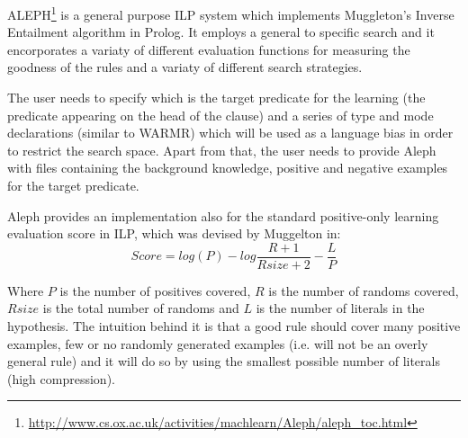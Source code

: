 ALEPH\footnote{\url{http://www.cs.ox.ac.uk/activities/machlearn/Aleph/aleph_toc.html}} is a general purpose ILP system which implements Muggleton's Inverse Entailment algorithm\cite{Muggleton95inverseentailment} in Prolog. It employs a general to specific search and it encorporates a variaty of different evaluation functions for measuring the goodness of the rules and a variaty of different search strategies. 

The user needs to specify which is the target predicate for the learning (the predicate appearing on the head of the clause) and a series of type and mode declarations (similar to WARMR) which will be used as a language bias in order to restrict the search space. Apart from that, the user needs to provide Aleph with files containing the background knowledge, positive and negative examples for the target predicate. 

Aleph provides an implementation also for the standard positive-only learning evaluation score in ILP, which was devised by Muggelton in\cite{Muggleton:1996:LPD:647996.742465}:
\[
 Score = log(P)-log\frac{R+1}{Rsize+2}-\frac{L}{P}
\]

Where $P$ is the number of positives covered, $R$ is the number of randoms covered, $Rsize$ is the total number of randoms and $L$ is the number of literals in the hypothesis. The intuition behind it is that a good rule should cover many positive examples, few or no randomly generated examples (i.e. will not be an overly general rule) and it will do so by using the smallest possible number of literals (high compression). 